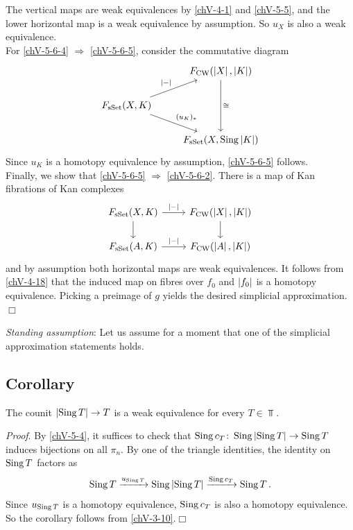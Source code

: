         The vertical maps are weak equivalences by \ref{chV-4-1} and \ref{chV-5-5}, and the lower horizontal map is a weak equivalence by assumption. So $u_X$ is also a weak equivalence.\\
        For \ref{chV-5-6-4} $\Rightarrow$ \ref{chV-5-6-5}, consider the commutative diagram
        \begin{equation*}
            \begin{tikzcd}
                & F_{\CW}(\gr{X}, \gr{K}) \arrow[dd, "\cong"] \\
                F_{\sSet}(X, K) \arrow[ur, "\gr{-}"] \arrow[dr, "{(u_K)_{*}}"] & \\
                & F_{\sSet}(X, \Sing \gr{K})
            \end{tikzcd}
        \end{equation*}
        Since $u_K$ is a homotopy equivalence by assumption, \ref{chV-5-6-5} follows.\\
        Finally, we show that \ref{chV-5-6-5} $\Rightarrow$ \ref{chV-5-6-2}. There is a map of Kan fibrations of Kan complexes
        \begin{equation*}
            \begin{tikzcd}
                F_{\sSet}(X, K) \arrow[d] \arrow[r, "\gr{-}"] & F_{\CW}(\gr{X}, \gr{K}) \arrow[d] \\
                F_{\sSet}(A, K) \arrow[r, "\gr{-}"] & F_{\CW}(\gr{A} , \gr{K})
            \end{tikzcd}
        \end{equation*}
        and by assumption both horizontal maps are weak equivalences. It follows from \ref{chV-4-18} that the induced map on fibres over $f_0$ and $\left| f_0 \right|$ is a homotopy equivalence. Picking a preimage of $g$ yields the desired simplicial approximation.\hfill$\Box$
        \medskip

        \emph{Standing assumption}: Let us assume for a moment that one of the simplicial approximation statements holds.

    \subsection{Corollary}\label{chV-5-7}
        The counit $\left| \operatorname{Sing} T \right| \to T$ is a weak equivalence for every $T \in \Top$.
        \smallskip

        \emph{Proof}. By \ref{chV-5-4}, it suffices to check that $\operatorname{Sing} c_T \colon \operatorname{Sing} \left| \operatorname{Sing} T \right| \to \operatorname{Sing} T$ induces bijections on all $\pi_n$. By one of the triangle identities, the identity on $\operatorname{Sing} T$ factors as
        \begin{equation*}
            \operatorname{Sing} T \xrightarrow{u_{\operatorname{Sing} T}} \operatorname{Sing} \left| \operatorname{Sing} T \right| \xrightarrow{\operatorname{Sing} c_T} \operatorname{Sing} T \,.
        \end{equation*}
        Since $u_{\operatorname{Sing} T}$ is a homotopy equivalence, $\operatorname{Sing} c_T$ is also a homotopy equivalence. So the corollary follows from \ref{chV-3-10}.\hfill$\Box$

